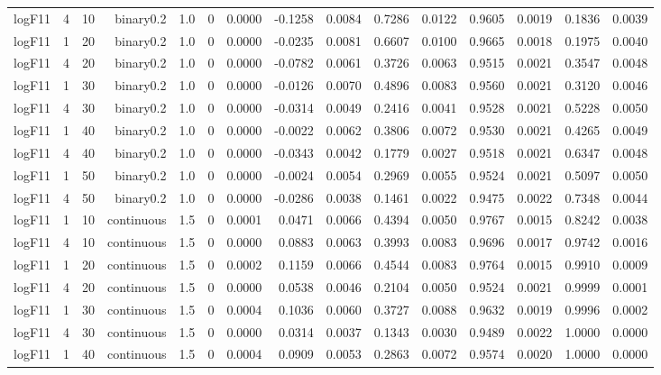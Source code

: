 \begin{longtable}{rrrrrrrrrrrrrrr}
  logF11 & 4 & 10 & binary0.2 & 1.0 & 0 & 0.0000 & -0.1258 & 0.0084 & 0.7286 & 0.0122 & 0.9605 & 0.0019 & 0.1836 & 0.0039 \\ 
  logF11 & 1 & 20 & binary0.2 & 1.0 & 0 & 0.0000 & -0.0235 & 0.0081 & 0.6607 & 0.0100 & 0.9665 & 0.0018 & 0.1975 & 0.0040 \\ 
  logF11 & 4 & 20 & binary0.2 & 1.0 & 0 & 0.0000 & -0.0782 & 0.0061 & 0.3726 & 0.0063 & 0.9515 & 0.0021 & 0.3547 & 0.0048 \\ 
  logF11 & 1 & 30 & binary0.2 & 1.0 & 0 & 0.0000 & -0.0126 & 0.0070 & 0.4896 & 0.0083 & 0.9560 & 0.0021 & 0.3120 & 0.0046 \\ 
  logF11 & 4 & 30 & binary0.2 & 1.0 & 0 & 0.0000 & -0.0314 & 0.0049 & 0.2416 & 0.0041 & 0.9528 & 0.0021 & 0.5228 & 0.0050 \\ 
  logF11 & 1 & 40 & binary0.2 & 1.0 & 0 & 0.0000 & -0.0022 & 0.0062 & 0.3806 & 0.0072 & 0.9530 & 0.0021 & 0.4265 & 0.0049 \\ 
  logF11 & 4 & 40 & binary0.2 & 1.0 & 0 & 0.0000 & -0.0343 & 0.0042 & 0.1779 & 0.0027 & 0.9518 & 0.0021 & 0.6347 & 0.0048 \\ 
  logF11 & 1 & 50 & binary0.2 & 1.0 & 0 & 0.0000 & -0.0024 & 0.0054 & 0.2969 & 0.0055 & 0.9524 & 0.0021 & 0.5097 & 0.0050 \\ 
  logF11 & 4 & 50 & binary0.2 & 1.0 & 0 & 0.0000 & -0.0286 & 0.0038 & 0.1461 & 0.0022 & 0.9475 & 0.0022 & 0.7348 & 0.0044 \\ 
  logF11 & 1 & 10 & continuous & 1.5 & 0 & 0.0001 & 0.0471 & 0.0066 & 0.4394 & 0.0050 & 0.9767 & 0.0015 & 0.8242 & 0.0038 \\ 
  logF11 & 4 & 10 & continuous & 1.5 & 0 & 0.0000 & 0.0883 & 0.0063 & 0.3993 & 0.0083 & 0.9696 & 0.0017 & 0.9742 & 0.0016 \\ 
  logF11 & 1 & 20 & continuous & 1.5 & 0 & 0.0002 & 0.1159 & 0.0066 & 0.4544 & 0.0083 & 0.9764 & 0.0015 & 0.9910 & 0.0009 \\ 
  logF11 & 4 & 20 & continuous & 1.5 & 0 & 0.0000 & 0.0538 & 0.0046 & 0.2104 & 0.0050 & 0.9524 & 0.0021 & 0.9999 & 0.0001 \\ 
  logF11 & 1 & 30 & continuous & 1.5 & 0 & 0.0004 & 0.1036 & 0.0060 & 0.3727 & 0.0088 & 0.9632 & 0.0019 & 0.9996 & 0.0002 \\ 
  logF11 & 4 & 30 & continuous & 1.5 & 0 & 0.0000 & 0.0314 & 0.0037 & 0.1343 & 0.0030 & 0.9489 & 0.0022 & 1.0000 & 0.0000 \\ 
  logF11 & 1 & 40 & continuous & 1.5 & 0 & 0.0004 & 0.0909 & 0.0053 & 0.2863 & 0.0072 & 0.9574 & 0.0020 & 1.0000 & 0.0000 \\ 

\end{longtable}
